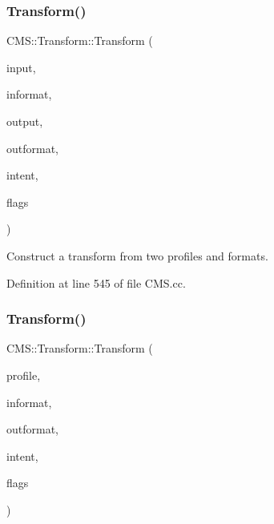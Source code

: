 \subsubsection{\texorpdfstring{Transform()}{Transform()}\hspace{0.1cm}{\footnotesize\ttfamily [1/2]}}
{\footnotesize\ttfamily C\+M\+S\+::\+Transform\+::\+Transform (\begin{DoxyParamCaption}\item[{\hyperlink{class_c_m_s_1_1_profile_a7d5a80e1317d17dbfdf5ae69820ab08b}{Profile\+::ptr}}]{input,  }\item[{const \hyperlink{class_c_m_s_1_1_format}{Format} \&}]{informat,  }\item[{\hyperlink{class_c_m_s_1_1_profile_a7d5a80e1317d17dbfdf5ae69820ab08b}{Profile\+::ptr}}]{output,  }\item[{const \hyperlink{class_c_m_s_1_1_format}{Format} \&}]{outformat,  }\item[{\hyperlink{namespace_c_m_s_aabe6afbe3c2cd6188befc3096f1ea069}{Intent}}]{intent,  }\item[{cms\+U\+Int32\+Number}]{flags }\end{DoxyParamCaption})}



Construct a transform from two profiles and formats. 



Definition at line 545 of file C\+M\+S.\+cc.

\mbox{\label{class_c_m_s_1_1_transform_a57aedf6fd469c51b245a28afb36f8eaf}} 
\subsubsection{\texorpdfstring{Transform()}{Transform()}\hspace{0.1cm}{\footnotesize\ttfamily [2/2]}}
{\footnotesize\ttfamily C\+M\+S\+::\+Transform\+::\+Transform (\begin{DoxyParamCaption}\item[{std\+::vector$<$ \hyperlink{class_c_m_s_1_1_profile_a7d5a80e1317d17dbfdf5ae69820ab08b}{Profile\+::ptr} $>$}]{profile,  }\item[{const \hyperlink{class_c_m_s_1_1_format}{Format} \&}]{informat,  }\item[{const \hyperlink{class_c_m_s_1_1_format}{Format} \&}]{outformat,  }\item[{\hyperlink{namespace_c_m_s_aabe6afbe3c2cd6188befc3096f1ea069}{Intent}}]{intent,  }\item[{cms\+U\+Int32\+Number}]{flags }\end{DoxyParamCaption})}



